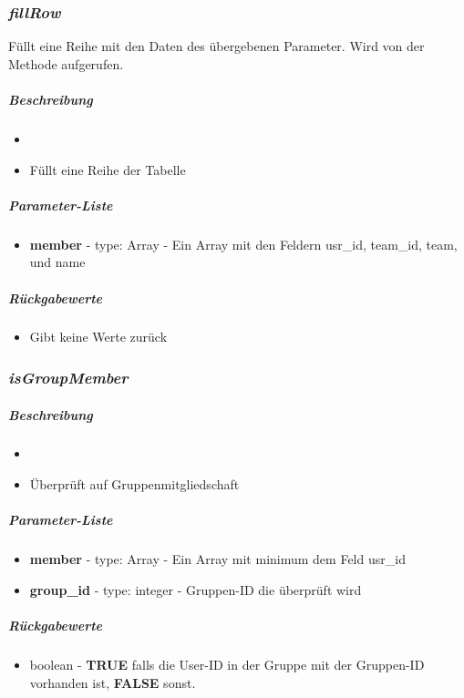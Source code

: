\subsubsection*{\textit{fillRow}}\label{fillRow}
Füllt eine Reihe mit den Daten des übergebenen Parameter. Wird von der Methode  aufgerufen.
\subparagraph{Beschreibung}
\begin{itemize}
	\item[]  \noindent{}
	\item[] Füllt eine Reihe der Tabelle
\end{itemize}
\subparagraph{Parameter-Liste}
\begin{itemize}
	\item[] \textbf{member} - type: Array - Ein Array mit den Feldern usr\_id, team\_id, team, und name
\end{itemize}
\subparagraph{Rückgabewerte}
\begin{itemize}
	\item[] Gibt keine Werte zurück
\end{itemize}

\subsubsection*{\textit{isGroupMember}}\label{isGroupMember}
\subparagraph{Beschreibung}
\begin{itemize}
	\item[]  \noindent{}
	\item[] Überprüft auf Gruppenmitgliedschaft 
\end{itemize}
\subparagraph{Parameter-Liste}
\begin{itemize}
	\item[] \textbf{member} - type: Array - Ein Array mit minimum dem Feld usr\_id
	\item[] \textbf{group\_id} - type: integer - Gruppen-ID die überprüft wird
\end{itemize}
\subparagraph{Rückgabewerte}
\begin{itemize}
	\item[] boolean - \textbf{TRUE} falls die User-ID in der Gruppe mit der Gruppen-ID vorhanden ist, \textbf{FALSE} sonst.
\end{itemize}
